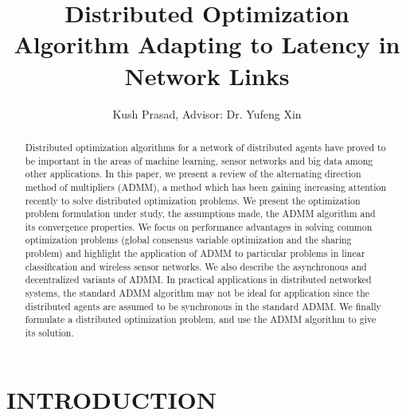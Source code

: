 \documentclass[letterpaper, 10 pt, conference]{ieeeconf}  %
\begin{document}
\title{\LARGE \bf
Distributed Optimization Algorithm Adapting to Latency in Network Links
}
\author{Kush Prasad, Advisor: Dr. Yufeng Xin}  %

\maketitle
\thispagestyle{empty}
\pagestyle{empty}




\begin{abstract}

Distributed optimization algorithms for a network of distributed agents have proved to be important in the areas of machine learning, sensor networks and big data among other applications. In this paper, we present a review of the alternating direction method of multipliers (ADMM), a method which has been gaining increasing attention recently to solve distributed optimization problems. We present the optimization problem formulation under study, the assumptions made, the ADMM algorithm and its convergence properties. We focus on performance advantages in solving common optimization problems (global consensus variable optimization and the sharing problem) and highlight the application of ADMM to particular problems in linear classification and wireless sensor networks. We also describe the asynchronous and decentralized variants of ADMM. In practical applications in distributed networked systems, the standard ADMM algorithm may not be ideal for application since the distributed agents are assumed to be synchronous in the standard ADMM. We finally formulate a distributed optimization problem, and use the ADMM algorithm to give its solution.

\end{abstract}


\section{INTRODUCTION}
\end{document}
